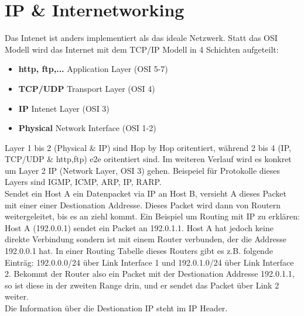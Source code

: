 \section{IP \& Internetworking}
    Das Intenet ist anders implementiert als das ideale Netzwerk. Statt das OSI Modell wird das Internet mit dem TCP/IP Modell in 4 Schichten aufgeteilt:
    \begin{itemize}
        \item \textbf{http, ftp,...} Application Layer (OSI 5-7)
        \item \textbf{TCP/UDP} Transport Layer (OSI 4)
        \item \textbf{IP} Intenet Layer (OSI 3)
        \item \textbf{Physical} Network Interface (OSI 1-2)
    \end{itemize}
    Layer 1 bis 2 (Physical \& IP) sind Hop by Hop oritentiert, während 2 bis 4 (IP, TCP/UDP \& http,ftp) e2e oritentiert sind. Im weiteren Verlauf wird es konkret um Layer 2 IP (Network Layer, OSI 3) gehen. Beispeiel für Protokolle dieses Layers sind IGMP, ICMP, ARP, IP, RARP. \\
    Sendet ein Host A ein Datenpacket via IP an Host B, versieht A dieses Packet mit einer einer Destionation Addresse. Dieses Packet wird dann von Routern weitergeleitet, bis es an ziehl kommt.  Ein Beispiel um Routing mit IP zu erklären: \\ Host A (192.0.0.1) sendet ein Packet an 192.0.1.1. Host A hat jedoch keine direkte Verbindung sondern ist mit einem Router verbunden, der die Addresse 192.0.0.1 hat. In einer Routing Tabelle dieses Routers gibt es z.B. folgende Einträg: 192.0.0.0/24  über Link Interface 1 und 192.0.1.0/24 über Link Interface 2. Bekommt der Router also ein Packet mit der Destionation Addresse 192.0.1.1, so ist diese in der zweiten Range drin, und er sendet das Packet über Link 2 weiter. \\ Die Information über die Destionation IP steht im IP Header.

